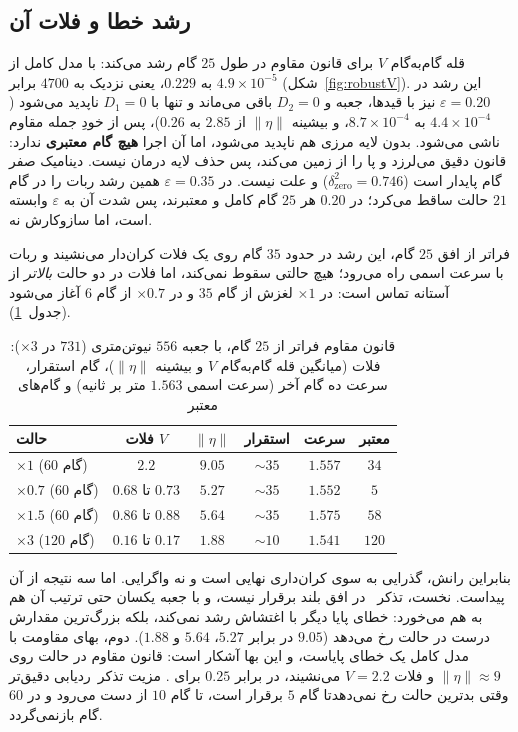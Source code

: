 \documentclass[10pt,twocolumn]{article}
\newcommand{\en}[1]{\lr{#1}}
\newcommand{\md}{\lr{\textemdash}}
\begin{document}
\subsection{رشد خطا و فلات آن}
قله گام‌به‌گام $V$ برای قانون مقاوم در طول $25$ گام رشد می‌کند: با مدل کامل از
$4.9\times10^{-5}$ به $0.229$، یعنی نزدیک به $4700$ برابر (شکل~\ref{fig:robustV}).
این رشد در $\varepsilon=0.20$ نیز با قیدها، جعبه و $D_2=0$ باقی می‌ماند و تنها با
$D_1=0$ ناپدید می‌شود ($4.4\times10^{-4}$ به $8.7\times10^{-4}$، و بیشینه
$\|\eta\|$ از $2.85$ به $0.26$)، پس از خودِ جمله مقاوم ناشی می‌شود. بدون لایه مرزی
هم ناپدید می‌شود، اما آن اجرا \textbf{هیچ گام معتبری} ندارد: قانون دقیق می‌لرزد و
پا را از زمین می‌کند، پس حذف لایه درمان نیست. دینامیک صفر گام پایدار است
($\delta^2_{\mathrm{zero}}=0.746$) و علت نیست. در $\varepsilon=0.35$ همین رشد ربات
را در گام $21$ حالت \en{I} ساقط می‌کرد؛ در $0.20$ هر $25$ گام کامل و معتبرند، پس
شدت آن به $\varepsilon$ وابسته است، اما سازوکارش نه.

فراتر از افق $25$ گام، این رشد در حدود $35$ گام روی یک فلات کران‌دار می‌نشیند و
ربات با سرعت اسمی راه می‌رود؛ هیچ حالتی سقوط نمی‌کند، اما فلات در دو حالت
\emph{بالاتر} از آستانه تماس است: در $\times1$ لغزش از گام $35$ و در $\times0.7$ از
گام $6$ آغاز می‌شود (جدول~\ref{tab:plateau}).

\begin{table}[H]
    \centering
    \caption{قانون مقاوم فراتر از $25$ گام، با جعبه $556$ نیوتن‌متری ($731$ در
    $\times3$): فلات (میانگین قله گام‌به‌گام $V$ و بیشینه $\|\eta\|$)، گام استقرار،
    سرعت ده گام آخر (سرعت اسمی $1.563$ متر بر ثانیه) و گام‌های معتبر}
    \label{tab:plateau}
    \small
    \begin{tabular}{lccccc}
        \toprule
        حالت & فلات $V$ & $\|\eta\|$ & استقرار & سرعت & معتبر \\
        \midrule
        $\times1$ ($60$ گام) & $2.2$ & $9.05$ & $\sim35$ & $1.557$ & $34$ \\
        $\times0.7$ ($60$ گام) & $0.68$ تا $0.73$ & $5.27$ & $\sim35$ & $1.552$ & $5$ \\
        $\times1.5$ ($60$ گام) & $0.86$ تا $0.88$ & $5.64$ & $\sim35$ & $1.575$ & $58$ \\
        $\times3$ ($120$ گام) & $0.16$ تا $0.17$ & $1.88$ & $\sim10$ & $1.541$ & $120$ \\
        \bottomrule
    \end{tabular}
\end{table}

بنابراین رانش، گذرایی به سوی کران‌داری نهایی است و نه واگرایی. اما سه نتیجه از آن
پیداست. نخست، تذکر~\en{4.6} در افق بلند برقرار نیست، و با جعبه یکسان حتی ترتیب آن
هم به هم می‌خورد: خطای پایا دیگر با اغتشاش رشد نمی‌کند، بلکه بزرگ‌ترین مقدارش
درست در حالت \en{I} رخ می‌دهد ($9.05$ در برابر $5.27$، $5.64$ و $1.88$). دوم، بهای
مقاومت با مدل کامل یک خطای پایاست، و این بها آشکار است: قانون مقاوم در
حالت \en{I} روی $\|\eta\|\approx9$ و فلات $V=2.2$ می‌نشیند، در برابر $0.25$ برای
\en{A}. مزیت تذکر~\en{4.7}\md{}ردیابی دقیق‌تر وقتی بدترین حالت رخ نمی‌دهد\md{}تا گام
$5$ برقرار است، تا گام $10$ از دست می‌رود و در $60$ گام بازنمی‌گردد.
\end{document}
